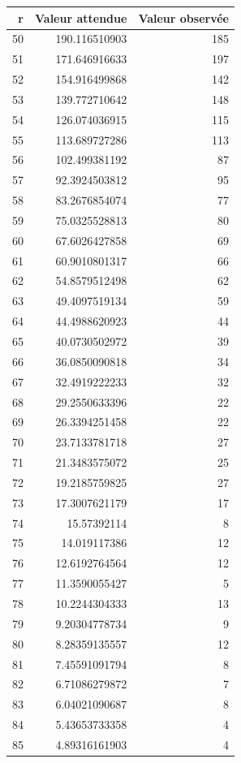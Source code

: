 \documentclass[10pt,a4paper]{article}
\begin{document}
\begin{figure}[h]
		\centering
\begin{tabular}{|r|r|r|}
\hline
r & Valeur attendue & Valeur observée\\
\hline
50 & 190.116510903 & 185\\
51 & 171.646916633 & 197\\
52 & 154.916499868 & 142\\
53 & 139.772710642 & 148\\
54 & 126.074036915 & 115\\
55 & 113.689727286 & 113\\
56 & 102.499381192 & 87\\
57 & 92.3924503812 & 95\\
58 & 83.2676854074 & 77\\
59 & 75.0325528813 & 80\\
60 & 67.6026427858 & 69\\
61 & 60.9010801317 & 66\\
62 & 54.8579512498 & 62\\
63 & 49.4097519134 & 59\\
64 & 44.4988620923 & 44\\
65 & 40.0730502972 & 39\\
66 & 36.0850090818 & 34\\
67 & 32.4919222233 & 32\\
68 & 29.2550633396 & 22\\
69 & 26.3394251458 & 22\\
70 & 23.7133781718 & 27\\
71 & 21.3483575072 & 25\\
72 & 19.2185759825 & 27\\
73 & 17.3007621179 & 17\\
74 & 15.57392114 & 8\\
75 & 14.019117386 & 12\\
76 & 12.6192764564 & 12\\
77 & 11.3590055427 & 5\\
78 & 10.2244304333 & 13\\
79 & 9.20304778734 & 9\\
80 & 8.28359135557 & 12\\
81 & 7.45591091794 & 8\\
82 & 6.71086279872 & 7\\
83 & 6.04021090687 & 8\\
84 & 5.43653733358 & 4\\
85 & 4.89316161903 & 4\\

\end{tabular}
\end{figure}
\end{document}
